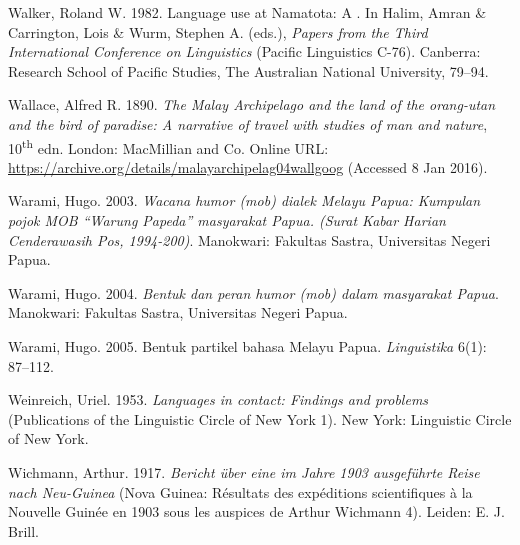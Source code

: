 \begin{styleCitaviBibliographyEntry}
Walker, Roland W. 1982. Language use at Namatota: A . In Halim, Amran \& Carrington, Lois \& Wurm, Stephen A. (eds.), \textit{Papers from the Third International Conference on  Linguistics} (Pacific Linguistics C-76). Canberra: Research School of Pacific Studies, The Australian National University, 79–94.
\end{styleCitaviBibliographyEntry}

\begin{styleCitaviBibliographyEntry}
Wallace, Alfred R. 1890. \textit{The Malay Archipelago and the land of the orang-utan and the bird of paradise: A narrative of travel with studies of man and nature}, 10\textsuperscript{th} edn. London: MacMillian and Co. Online URL: \url{https://archive.org/details/malayarchipelag04wallgoog} (Accessed 8 Jan 2016).
\end{styleCitaviBibliographyEntry}

\begin{styleCitaviBibliographyEntry}
Warami, Hugo. 2003. \textit{Wacana humor (mob) dialek Melayu Papua: Kumpulan pojok MOB “Warung Papeda” masyarakat Papua. (Surat Kabar Harian Cenderawasih Pos, 1994-200)}. Manokwari: Fakultas Sastra, Universitas Negeri Papua.
\end{styleCitaviBibliographyEntry}

\begin{styleCitaviBibliographyEntry}
Warami, Hugo. 2004. \textit{Bentuk dan peran humor (mob) dalam masyarakat Papua}. Manokwari: Fakultas Sastra, Universitas Negeri Papua.
\end{styleCitaviBibliographyEntry}

\begin{styleCitaviBibliographyEntry}
Warami, Hugo. 2005. Bentuk partikel bahasa Melayu Papua. \textit{Linguistika} 6(1): 87–112.
\end{styleCitaviBibliographyEntry}

\begin{styleCitaviBibliographyEntry}
Weinreich, Uriel. 1953. \textit{Languages in contact: Findings and problems} (Publications of the Linguistic Circle of New York 1). New York: Linguistic Circle of New York.
\end{styleCitaviBibliographyEntry}

\begin{styleCitaviBibliographyEntry}
Wichmann, Arthur. 1917. \textit{Bericht \"{u}ber eine im Jahre 1903 ausgef\"{u}hrte Reise nach Neu-Guinea} (Nova Guinea: R\'{e}sultats des exp\'{e}ditions scientifiques \`{a} la Nouvelle Guin\'{e}e en 1903 sous les auspices de Arthur Wichmann 4). Leiden: E. J. Brill.
\end{styleCitaviBibliographyEntry}

